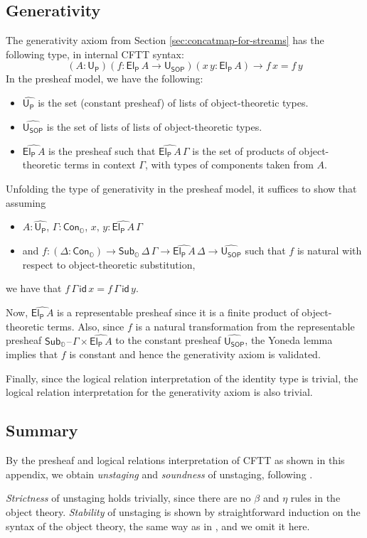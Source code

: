 \documentclass[acmsmall]{acmart}
\newcommand{\mit}[1]{{\mathsf{#1}}}
\newcommand{\msf}[1]{{\mathsf{#1}}}
\newcommand{\mbb}[1]{\mathbb{#1}}
\newcommand{\U}{\mathsf{U}}
\newcommand{\wh}[1]{\widehat{#1}}
\newcommand{\Cono}{\msf{Con}_{\mbbo}}
\newcommand{\Subo}{\msf{Sub}_{\mbbo}}
\newcommand{\mbbo}{\mbb{O}}
\newcommand{\USOP}{\msf{U}_{\msf{SOP}}}
\newcommand{\Uprod}{\msf{U_P}}
\newcommand{\Elprod}{\msf{El_{P}}}
\newcommand{\blank}{{\mathord{\hspace{1pt}\text{--}\hspace{1pt}}}}
\theoremstyle{remark}
\newcommand{\id}{\mit{id}}
\begin{document}
\subsection{Generativity} \label{appendix:generativity}

The generativity axiom from Section \ref{sec:concatmap-for-streams} has the following type, in internal
CFTT syntax:
\[ (A : \U_\msf{P})(f : \Elprod\,A \to \USOP)(x\,y : \Elprod\,A) \to f\,x = f\,y  \]
In the presheaf model, we have the following:
\begin{itemize}
\item $\wh{\Uprod}$ is the set (constant presheaf) of lists of object-theoretic types.
\item $\wh{\USOP}$ is the set of lists of lists of object-theoretic types.
\item $\wh{\Elprod\,A}$ is the presheaf such that $\wh{\Elprod\,A}\,\Gamma$ is
  the set of products of object-theoretic terms in context $\Gamma$, with types
  of components taken from $A$.
\end{itemize}
Unfolding the type of generativity in the presheaf model, it suffices to show
that assuming
\begin{itemize}
\item $A : \wh{\Uprod}$, $\Gamma : \Cono$, $x,\,y : \wh{\Elprod\,A}\,\Gamma$
\item and $f : (\Delta : \Cono) \to \Subo\,\Delta\,\Gamma \to \wh{\Elprod\,A}\,\Delta \to \wh{\USOP}$ such that $f$ is natural with respect to object-theoretic substitution,
\end{itemize}
we have that $f\,\Gamma\,\id\,x = f\,\Gamma\,\id\,y$.

Now, $\wh{\Elprod\,A}$ is a representable presheaf since it is a finite product
of object-theoretic terms. Also, since $f$ is a natural transformation from the
representable presheaf $\Subo\blank\Gamma \times \wh{\Elprod\,A}$ to the
constant presheaf $\wh{\USOP}$, the Yoneda lemma implies that $f$ is constant and
hence the generativity axiom is validated.

Finally, since the logical relation interpretation of the identity type is trivial,
the logical relation interpretation for the generativity axiom is also trivial.

\subsection{Summary}

By the presheaf and logical relations interpretation of CFTT as shown in this appendix,
we obtain \emph{unstaging} and \emph{soundness} of unstaging, following \cite{staged2ltt}.

\emph{Strictness} of unstaging holds trivially, since there are no $\beta$ and
$\eta$ rules in the object theory. \emph{Stability} of unstaging is shown by
straightforward induction on the syntax of the object theory, the same way as in
\cite{staged2ltt}, and we omit it here.


\end{document}
